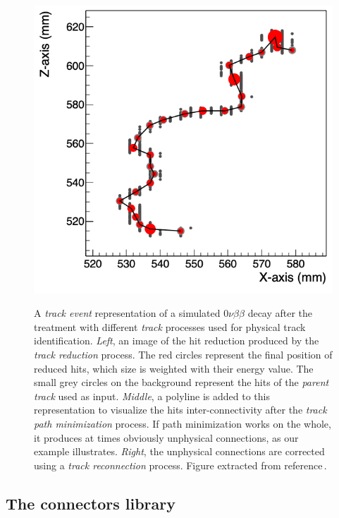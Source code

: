 \begin{figure}[htb!]
{    \includegraphics[totalheight=4.9cm]{images/TrackReconnected.png}}
    \caption{A \emph{track event} representation of a simulated $0\nu\beta\beta$ decay after the treatment with different \emph{track} processes used for physical track identification. \emph{Left}, an image of the hit reduction produced by the \emph{track reduction} process. The red circles represent the final position of reduced hits, which size is weighted with their energy value. The small grey circles on the background represent the hits of the \emph{parent track} used as input. \emph{Middle}, a polyline is added to this representation to visualize the hits inter-connectivity after the \emph{track path minimization} process. If path minimization works on the whole, it produces at times obviously unphysical connections, as our example illustrates. \emph{Right}, the unphysical connections are corrected using a \emph{track reconnection} process. Figure extracted from reference\,\cite{Galan:2019ake}.}
    \label{fig:tracklib}
\end{figure}

\subsection{The connectors library}\label{sc:connectorslib}

